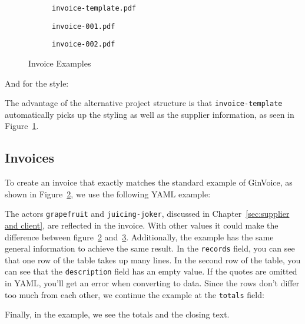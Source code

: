 \onecolumn
\begin{figure}[!ht]
    \begin{subfigure}{.32\linewidth}
        \caption{\texttt{invoice-template.pdf}}\label{fig:result alt}
    \end{subfigure}\hfill
    \begin{subfigure}{.32\linewidth}
        \caption{\texttt{invoice-001.pdf}}\label{fig:result 1}
    \end{subfigure}\hfill
    \begin{subfigure}{.32\linewidth}
        \caption{\texttt{invoice-002.pdf}}\label{fig:result 2}
    \end{subfigure}
    \caption{Invoice Examples}\label{fig:pdfs}
\end{figure}
\begin{multicols}{2}
    And for the style:
    

    The advantage of the alternative project structure is that \texttt{invoice-template} automatically picks up the styling as well as the supplier information, as seen in Figure~\ref{fig:result alt}.

    \subsection{Invoices}
    To create an invoice that exactly matches the standard example of GinVoice, as shown in Figure~\ref{fig:result 1}, we use the following YAML example:
    
    The actors \texttt{grapefruit} and \texttt{juicing-joker}, discussed in Chapter~\ref{sec:supplier and client}, are reflected in the invoice.
    With other values it could make the difference between figure~\ref{fig:result 1} and~\ref{fig:result 2}.
    Additionally, the example has the same general information to achieve the same result.
    In the \texttt{records} field, you can see that one row of the table takes up many lines.
    In the second row of the table, you can see that the \texttt{description} field has an empty value.
    If the quotes are omitted in YAML, you'll get an error when converting to data.
    Since the rows don't differ too much from each other, we continue the example at the \texttt{totals} field:
    
\end{multicols}
\twocolumn

Finally, in the example, we see the totals and the closing text.

